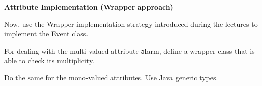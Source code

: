 \documentclass[a4paper,11pt]{memoir}
\newcommand{\code}[1]{{\texttt #1}}
\begin{document}
	
\begin{exercise}
	\textbf{Attribute Implementation (Wrapper approach)}
	
Now, use the Wrapper implementation strategy introduced during the lectures to implement the Event class.
	\begin{inparaenum}
		\item For dealing with the multi-valued attribute \code{alarm}, define a wrapper class that is able to check its multiplicity.
		\item Do the same for the mono-valued attributes. Use Java generic types.
	\end{inparaenum}
\end{exercise}
\begin{solution}
	
	
	
	
\end{solution}
\end{document}
